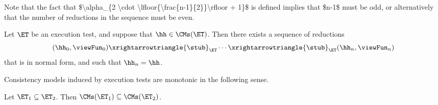 \ac{Note that the fact that $\alpha_{2 \cdot \lfloor{\frac{n-1}{2}}\rfloor + 1}$ is defined implies that $n-1$ must be odd, or alternatively that 
the number of reductions in the sequence must be even.}

\begin{proposition}
\label{prop:et.normalform}
Let $\ET$ be an execution test, and suppose that $\hh \in \CMs(\ET)$. Then there exists a sequence of 
reductions 
\[
(\hh_0, \viewFun_0) \xrightarrowtriangle{\stub}_{\ET} \cdots \xrightarrowtriangle{\stub}_{\ET} (\hh_n, \viewFun_{n})
\]
that is in normal form, and such that $\hh_{n} = \hh$.
\end{proposition}

Consistency models induced by execution tests are monotonic in the following sense.
\begin{proposition}
\label{prop:mono-et}
Let $\ET_1 \subseteq \ET_2$. Then $\CMs(\ET_1) \subseteq \CMs(\ET_2)$.
\end{proposition}
%
%

